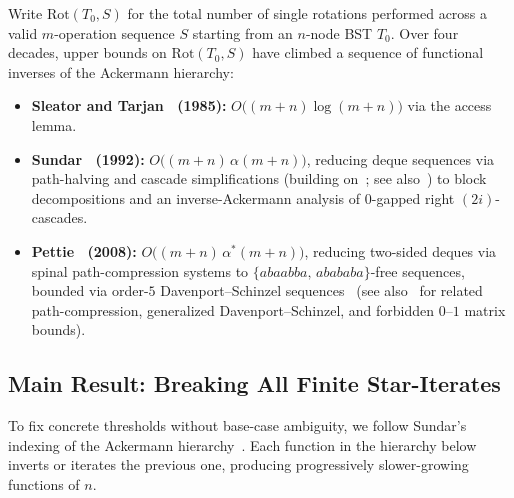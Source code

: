 \documentclass[11pt]{article}
\theoremstyle{definition}
\theoremstyle{remark}
\newcommand{\Rot}{\mathrm{Rot}}
\begin{document}
Write $\Rot(T_0, S)$ for the total number of single rotations performed across a valid $m$-operation sequence $S$ starting from an $n$-node BST $T_0$. Over four decades, upper bounds on $\Rot(T_0, S)$ have climbed a sequence of functional inverses of the Ackermann hierarchy:
\begin{itemize}[leftmargin=2em]
  \item \textbf{Sleator and Tarjan~\cite{SleatorTarjan1985} (1985):} $O\big((m + n)\log(m + n)\big)$ via the access lemma.
  \item \textbf{Sundar~\cite{Sundar1992} (1992):} $O\big((m + n)\,\alpha(m + n)\big)$, reducing deque sequences via path-halving and cascade simplifications (building on~\cite{TarjanVanLeeuwen1984,Tarjan1985,Lucas1990,Lucas1992}; see also~\cite{BuchsbaumSundarTarjan1995}) to block decompositions and an inverse-Ackermann analysis of $0$-gapped right $(2i)$-cascades.
  \item \textbf{Pettie~\cite{Pettie2008} (2008):} $O\big((m + n)\,\alpha^*(m + n)\big)$, reducing two-sided deques via spinal path-compression systems to $\{a b a a b b a,\, a b a b a b a\}$-free sequences, bounded via order-$5$ Davenport--Schinzel sequences~\cite{HartSharir1986,Sharir1987,AgarwalSharirShor1989} (see also~\cite{SeidelSharir2005,Nivasch2010,Pettie2010} for related path-compression, generalized Davenport--Schinzel, and forbidden $0$--$1$ matrix bounds).
\end{itemize}

\subsection{Main Result: Breaking All Finite Star-Iterates}

To fix concrete thresholds without base-case ambiguity, we follow Sundar's indexing of the Ackermann hierarchy~\cite[Section~1.2]{Sundar1992}. Each function in the hierarchy below inverts or iterates the previous one, producing progressively slower-growing functions of $n$.
\end{document}
